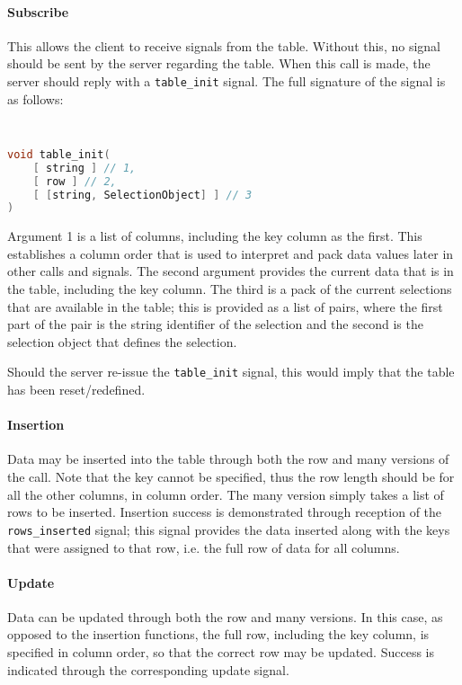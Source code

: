 \documentclass[11pt, oneside]{amsart}
\begin{document}
\paragraph{\textbf{Subscribe}} This allows the client to receive signals from the table. Without this, no signal should be sent by the server regarding the table. When this call is made, the server should reply with a \texttt{table\_init} signal. The full signature of the signal is as follows:

\lstinline[language=c++]|  |

\begin{lstlisting}[language=c++]
void table_init(
	[ string ] // 1,
	[ row ] // 2,
	[ [string, SelectionObject] ] // 3
)
\end{lstlisting}

Argument 1 is a list of columns, including the key column as the first. This establishes a column order that is used to interpret and pack data values later in other calls and signals. The second argument provides the current data that is in the table, including the key column. The third is a pack of the current selections that are available in the table; this is provided as a list of pairs, where the first part of the pair is the string identifier of the selection and the second is the selection object that defines the selection.

Should the server re-issue the \texttt{table\_init} signal, this would imply that the table has been reset/redefined.

\paragraph{\textbf{Insertion}} Data may be inserted into the table through both the row and many versions of the call. Note that the key cannot be specified, thus the row length should be for all the other columns, in column order. The many version simply takes a list of rows to be inserted. Insertion success is demonstrated through reception of the \texttt{rows\_inserted} signal; this signal provides the data inserted along with the keys that were assigned to that row, i.e. the full row of data for all columns.

\paragraph{\textbf{Update}} Data can be updated through both the row and many versions. In this case, as opposed to the insertion functions, the full row, including the key column, is specified in column order, so that the correct row may be updated. Success is indicated through the corresponding update signal.
\end{document}
